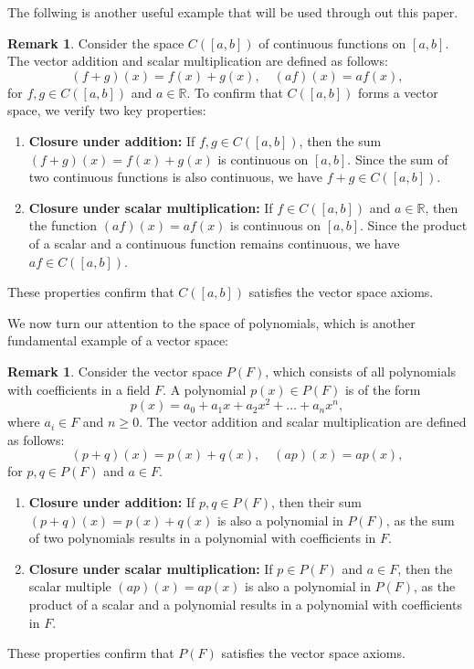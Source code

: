 \documentclass[12pt, reqno]{amsart}
\theoremstyle{definition}
\newtheorem{remark}[theorem]{Remark}
\numberwithin{equation}{section}
\newcommand{\dR}{{\mathbb R}}
\begin{document}
The follwing is another useful example that will be used through out this paper.
\begin{remark}
Consider the space $C([a, b])$ of continuous functions on $[a, b]$. The vector addition and scalar multiplication are defined as follows:
\[
(f+g)(x) = f(x) + g(x), \quad (af)(x) = a f(x),
\]
for $f, g \in C([a, b])$ and $a \in \dR$. To confirm that $C([a, b])$ forms a vector space, we verify two key properties:

\begin{enumerate}
    \item \textbf{Closure under addition:} If $f, g \in C([a, b])$, then the sum $(f+g)(x) = f(x) + g(x)$ is continuous on $[a, b]$. Since the sum of two continuous functions is also continuous, we have $f+g \in C([a, b])$.
    
    \item \textbf{Closure under scalar multiplication:} If $f \in C([a, b])$ and $a \in \dR$, then the function $(af)(x) = a f(x)$ is continuous on $[a, b]$. Since the product of a scalar and a continuous function remains continuous, we have $af \in C([a, b])$.
\end{enumerate}

These properties confirm that $C([a, b])$ satisfies the vector space axioms.
\end{remark}

We now turn our attention to the space of polynomials, which is another fundamental example of a vector space:

\begin{remark}
Consider the vector space $P(F)$, which consists of all polynomials with coefficients in a field $F$. A polynomial $p(x) \in P(F)$ is of the form
\[
p(x) = a_0 + a_1 x + a_2 x^2 + \dots + a_n x^n,
\]
where $a_i \in F$ and $n \geq 0$. The vector addition and scalar multiplication are defined as follows:
\[
(p+q)(x) = p(x) + q(x), \quad (a p)(x) = a p(x),
\]
for $p, q \in P(F)$ and $a \in F$. 

\begin{enumerate}
    \item \textbf{Closure under addition:} If $p, q \in P(F)$, then their sum $(p+q)(x) = p(x) + q(x)$ is also a polynomial in $P(F)$, as the sum of two polynomials results in a polynomial with coefficients in $F$.

    \item \textbf{Closure under scalar multiplication:} If $p \in P(F)$ and $a \in F$, then the scalar multiple $(ap)(x) = a p(x)$ is also a polynomial in $P(F)$, as the product of a scalar and a polynomial results in a polynomial with coefficients in $F$.
\end{enumerate}

These properties confirm that $P(F)$ satisfies the vector space axioms.
\end{remark}
\end{document}

